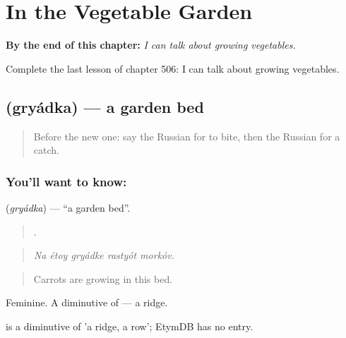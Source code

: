 
\chapter{In the Vegetable Garden}
\label{ch:ru-in-the-vegetable-garden}

\begin{chapteropening}
\textbf{By the end of this chapter:} \emph{I can talk about growing vegetables.}

Complete the last lesson of chapter 506: I can talk about growing vegetables.
\end{chapteropening}

\section[\texorpdfstring{\ru{грядка} (gryádka)}{грядка (gryádka)}]{ (gryádka) — a garden bed}

\label{lesson:RU-C506-gryadka}



\begin{quote}
Before the new one: say the Russian for to bite, then the Russian for a catch.
\end{quote}

\subsection*{You'll want to know: }
\textbf{} (\emph{gryádka}) — \textquotedblleft{}a garden bed\textquotedblright{}.

\begin{quote}
    .
\end{quote}

\begin{quote}
\emph{Na étoy gryádke rastyót morkóv.}
\end{quote}

\begin{quote}
Carrots are growing in this bed.
\end{quote}

Feminine. A diminutive of \emph{} — a ridge.

\begin{cousinweb}
\emph{} is a diminutive of \emph{} 'a ridge, a row'; EtymDB has no entry.
\end{cousinweb}

